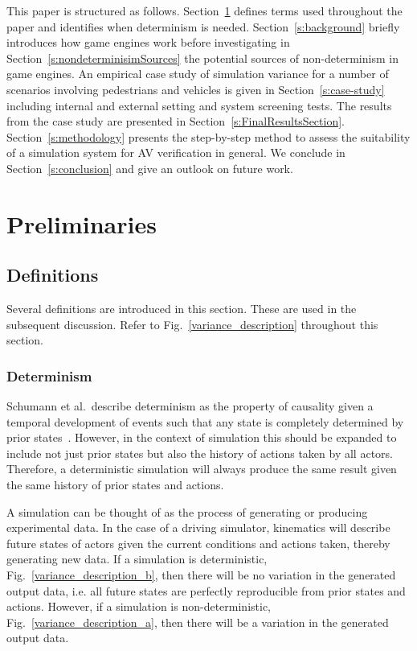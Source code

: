 This paper is structured as follows.
%
Section~\ref{s:prelim} defines terms used throughout the paper and identifies when determinism is needed. 
Section~\ref{s:background} briefly introduces how game engines work before investigating in Section~\ref{s:nondeterminisimSources} the potential sources of non-determinism in game engines.
%
An empirical case study of simulation variance for a number of scenarios involving pedestrians and vehicles is given in Section~\ref{s:case-study} including internal and external setting and system screening tests. 
%
The results from the case study are presented in Section~\ref{s:FinalResultsSection}. 
%
Section~\ref{s:methodology} presents the step-by-step method to assess the suitability of a simulation system for AV verification in general. 
%
We conclude in Section~\ref{s:conclusion} and give an outlook on future work.


\section{Preliminaries} \label{s:prelim}
\subsection{Definitions}
Several definitions are introduced in this section. These are used in the subsequent discussion. Refer to Fig.~\ref{variance_description} throughout this section.
\\

\subsubsection{Determinism}
\DIFaddbegin 

\DIFaddend Schumann et al.\ describe determinism as the property of causality given a temporal development of events such that any state is completely determined by prior states~\cite{Schumann2010}. However, in the context of simulation this should be expanded to include not just prior states but also the history of actions taken by all actors. Therefore, a deterministic simulation will always produce the same result given the same history of prior states and actions.

A simulation can be thought of as the process of generating or producing experimental data. In the case of a driving simulator, kinematics will describe future states of actors given the current conditions and actions taken, thereby generating new data. If a simulation is deterministic, Fig.~\ref{variance_description_b}, then there will be no variation in the generated output data, i.e. all future states are perfectly reproducible from prior states and actions. However, if a simulation is non-deterministic, Fig.~\ref{variance_description_a}, then there will be a variation in the generated output data. \\

